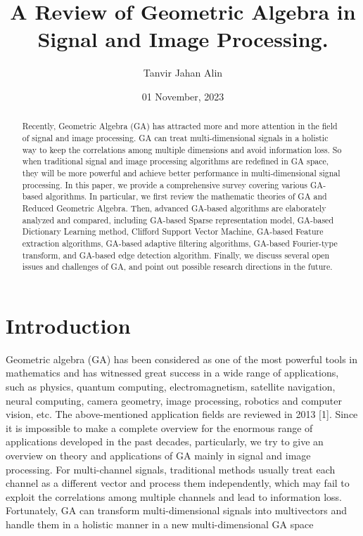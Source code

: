 \documentclass{article}
\title{A Review of Geometric Algebra in Signal and Image Processing.}
\author{Tanvir Jahan Alin}
\date{01 November, 2023}
\begin{document}
\maketitle

\begin{abstract}

Recently, Geometric Algebra (GA) has attracted more and more attention in the field of signal
and image processing. GA can treat multi-dimensional signals in a holistic way to keep the correlations
among multiple dimensions and avoid information loss. So when traditional signal and image processing
algorithms are redefined in GA space, they will be more powerful and achieve better performance in
multi-dimensional signal processing. In this paper, we provide a comprehensive survey covering various
GA-based algorithms. In particular, we first review the mathematic theories of GA and Reduced Geometric Algebra. Then, advanced GA-based algorithms are elaborately analyzed and compared, including GA-based Sparse representation model, GA-based Dictionary Learning method, Clifford Support Vector Machine, GA-based Feature extraction algorithms, GA-based adaptive filtering algorithms, GA-based
Fourier-type transform, and GA-based edge detection algorithm. Finally, we discuss several open issues
and challenges of GA, and point out possible research directions in the future.
  
\end{abstract}

\section{Introduction}
Geometric algebra (GA) has been considered as one of the
most powerful tools in mathematics and has witnessed great
success in a wide range of applications, such as physics, quantum computing, electromagnetism, satellite navigation, neural computing, camera geometry, image processing, robotics
and computer vision, etc. The above-mentioned application
fields are reviewed in 2013 [1]. Since it is impossible to make
a complete overview for the enormous range of applications
developed in the past decades, particularly, we try to give an
overview on theory and applications of GA mainly in signal
and image processing.
\newline
For multi-channel signals, traditional methods usually
treat each channel as a different vector and process them
independently, which may fail to exploit the correlations
among multiple channels and lead to information loss. Fortunately, GA can transform multi-dimensional signals into
multivectors and handle them in a holistic manner in a
new multi-dimensional GA space
\end{document}
